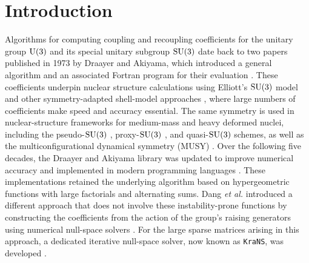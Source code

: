 \documentclass[aps,onecolumn,10pt,superscriptaddress,floatfix,nofootinbib]{revtex4}
\begin{document}
\section{Introduction}
\label{sec:intro}

Algorithms for computing coupling and recoupling coefficients for the unitary group
$\rm U(3)$ and its special unitary subgroup $\rm SU(3)$ date back to two papers published in 1973 by Draayer and Akiyama,
which introduced a general algorithm \cite{Draayer1973JMP} and an
associated Fortran program for their evaluation \cite{Akiyama1973CPC}.
These coefficients underpin nuclear structure calculations using Elliott's
$\rm SU(3)$ model \cite{Elliott1958I,Elliott1958II} and other symmetry-adapted
shell-model approaches \cite{Dytrych2013PRL,Dytrych2020PRL,McCoy2020PRL}, where large numbers of coefficients make speed and accuracy essential.
The same symmetry is used in nuclear-structure frameworks for
medium-mass and heavy deformed nuclei, including the pseudo-$\rm SU(3)$
\cite{Kota2020,Cseh2020PRC,Gade2025NatPhys}, proxy-$\rm SU(3)$ \cite{Bonatsos2023Symmetry,Cseh2020PRC},
and quasi-$\rm SU(3)$ \cite{Zuker1995PRC,Gade2025NatPhys} schemes, as well as the
multiconfigurational dynamical symmetry (MUSY) \cite{Cseh2021PRC}. Over the following five decades, the Draayer
and Akiyama library was updated to improve numerical accuracy
\cite{Bahri2004CPC} and implemented in modern programming languages
\cite{Dytrych2021CPC,Herko2026EPJA}. These implementations retained the
underlying algorithm based on hypergeometric functions with large factorials
and alternating sums. Dang \textit{et al.} introduced a different approach that does 
not involve these instability-prone functions
by constructing the coefficients from the action of the group's raising generators
using numerical null-space solvers \cite{Dang2024EPJP1,Alex2011JMP}.
For the large sparse matrices arising in this approach,
a dedicated iterative null-space solver, now known as
\texttt{KraNS}, was developed \cite{Krastenov2026MSc}.
\end{document}
